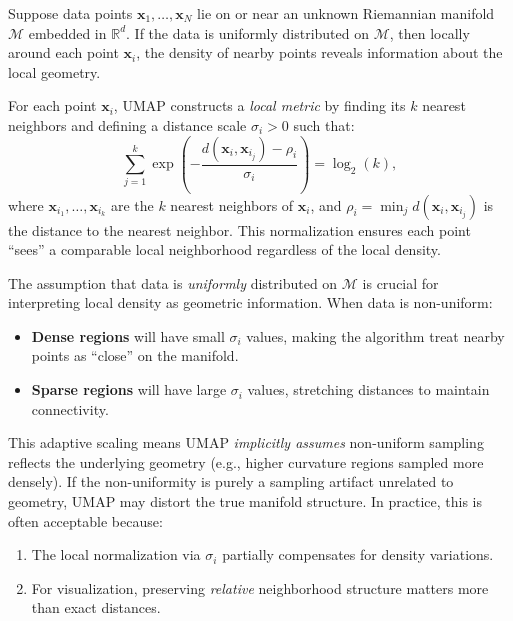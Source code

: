 Suppose data points $\mathbf{x}_1, \dots, \mathbf{x}_N$ lie on or near an unknown Riemannian manifold $\mathcal{M}$ embedded in $\mathbb{R}^d$. If the data is uniformly distributed on $\mathcal{M}$, then locally around each point $\mathbf{x}_i$, the density of nearby points reveals information about the local geometry.

For each point $\mathbf{x}_i$, UMAP constructs a \emph{local metric} by finding its $k$ nearest neighbors and defining a distance scale $\sigma_i > 0$ such that:
\begin{equation}\label{eq:umap-sigma}
  \sum_{j=1}^{k} \exp\left(-\frac{d(\mathbf{x}_i, \mathbf{x}_{i_j}) - \rho_i}{\sigma_i}\right) = \log_2(k),
\end{equation}
where $\mathbf{x}_{i_1}, \dots, \mathbf{x}_{i_k}$ are the $k$ nearest neighbors of $\mathbf{x}_i$, and $\rho_i = \min_j d(\mathbf{x}_i, \mathbf{x}_{i_j})$ is the distance to the nearest neighbor. This normalization ensures each point ``sees'' a comparable local neighborhood regardless of the local density.

\begin{remark}\label{rem:umap-uniformity}
  The assumption that data is \emph{uniformly} distributed on $\mathcal{M}$ is crucial for interpreting local density as geometric information. When data is non-uniform:
  \begin{itemize}
    \item \textbf{Dense regions} will have small $\sigma_i$ values, making the algorithm treat nearby points as ``close'' on the manifold.
    \item \textbf{Sparse regions} will have large $\sigma_i$ values, stretching distances to maintain connectivity.
  \end{itemize}
  This adaptive scaling means UMAP \emph{implicitly assumes} non-uniform sampling reflects the underlying geometry (e.g., higher curvature regions sampled more densely). If the non-uniformity is purely a sampling artifact unrelated to geometry, UMAP may distort the true manifold structure. In practice, this is often acceptable because:
  \begin{enumerate}
    \item The local normalization via $\sigma_i$ partially compensates for density variations.
    \item For visualization, preserving \emph{relative} neighborhood structure matters more than exact distances.
  \end{enumerate}
\end{remark}

